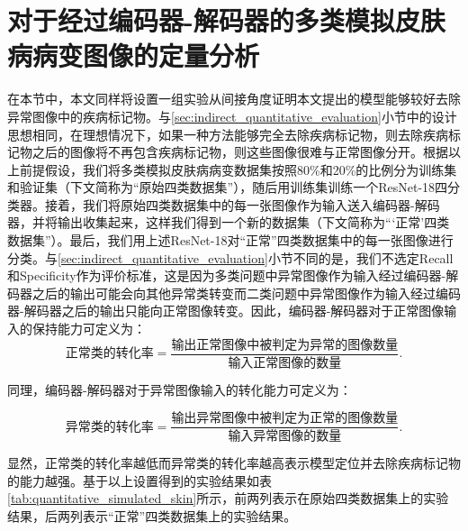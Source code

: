 \section{对于经过编码器-解码器的多类模拟皮肤病病变图像的定量分析}
在本节中，本文同样将设置一组实验从间接角度证明本文提出的模型能够较好去除异常图像中的疾病标记物。与\ref{sec:indirect_quantitative_evaluation}小节中的设计思想相同，在理想情况下，如果一种方法能够完全去除疾病标记物，则去除疾病标记物之后的图像将不再包含疾病标记物，则这些图像很难与正常图像分开。根据以上前提假设，我们将多类模拟皮肤病病变数据集按照80\%和20\%的比例分为训练集和验证集（下文简称为“原始四类数据集”），随后用训练集训练一个ResNet-18四分类器。接着，我们将原始四类数据集中的每一张图像作为输入送入编码器-解码器，并将输出收集起来，这样我们得到一个新的数据集（下文简称为“‘正常’四类数据集”）。最后，我们用上述ResNet-18对“正常”四类数据集中的每一张图像进行分类。与\ref{sec:indirect_quantitative_evaluation}小节不同的是，我们不选定Recall和Specificity作为评价标准，这是因为多类问题中异常图像作为输入经过编码器-解码器之后的输出可能会向其他异常类转变而二类问题中异常图像作为输入经过编码器-解码器之后的输出只能向正常图像转变。因此，编码器-解码器对于正常图像输入的保持能力可定义为：
\begin{equation}\label{equ:normal_imgs_kep_rate}
\text{正常类的转化率}=\frac{\text{输出正常图像中被判定为异常的图像数量}}{\text{输入正常图像的数量}}.
\end{equation}

\noindent 同理，编码器-解码器对于异常图像输入的转化能力可定义为：

\begin{equation}\label{equ:lesion_imgs_converted_rate}
\text{异常类的转化率}=\frac{\text{输出异常图像中被判定为正常的图像数量}}{\text{输入异常图像的数量}}.
\end{equation}

\noindent 显然，正常类的转化率越低而异常类的转化率越高表示模型定位并去除疾病标记物的能力越强。基于以上设置得到的实验结果如表\ref{tab:quantitative_simulated_skin}所示，前两列表示在原始四类数据集上的实验结果，后两列表示“正常”四类数据集上的实验结果。

